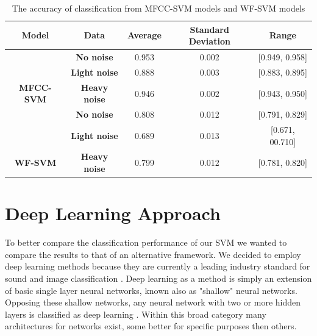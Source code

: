 \documentclass[12pt]{article}
\begin{document}
\begin{multicols*}{2}
\begin{table}[htbp]
\centering
\caption{The accuracy of classification from MFCC-SVM models and WF-SVM models}
\label{table:accuracy}
\begin{tabular}{ccccc}
\hline
\textbf{Model}                      & \textbf{Data}        & \textbf{Average} & \textbf{Standard Deviation}  & \textbf{Range}                            \\ \hline
                                    & \textbf{No noise}    & 0.953            & {\color[HTML]{000000} 0.002} & {\color[HTML]{000000} {[}0.949, 0.958{]}} \\
                                    & \textbf{Light noise} & 0.888            & {\color[HTML]{000000} 0.003} & {\color[HTML]{000000} {[}0.883, 0.895{]}} \\
\multirow{-3}{*}{\textbf{MFCC-SVM}} & \textbf{Heavy noise} & 0.946            & 0.002                        & {[}0.943, 0.950{]}                        \\
                                    & \textbf{No noise}    & 0.808            & 0.012                        & {[}0.791, 0.829{]}                        \\
                                    & \textbf{Light noise} & 0.689            & 0.013                        & {[}0.671, 00.710{]}                       \\
\multirow{-3}{*}{\textbf{WF-SVM}}   & \textbf{Heavy noise} & 0.799            & 0.012                        & {[}0.781, 0.820{]} \\
\hline
\end{tabular}
\end{table}

\section*{Deep Learning Approach}
To better compare the classification performance of our SVM we wanted to compare the results to that of an alternative framework. We decided to employ deep learning methods because they are currently a leading industry standard for sound and image classification \cite{Nielsen2019}. 
Deep learning as a method is simply an extension of basic single layer neural networks, known also as "shallow" neural networks. Opposing these shallow networks, any neural network with two or more hidden layers is classified as deep learning \cite{Nielsen2019}. Within this broad category many architectures for networks exist, some better for specific purposes then others. 


\end{multicols*}
\end{document}
